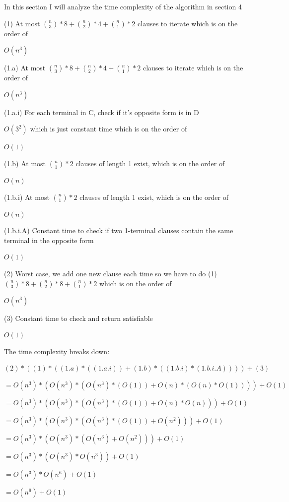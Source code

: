 \documentclass[manuscript]{acmart}
\begin{document}
    In this section I will analyze the time complexity of the algorithm in section 4

    (1) At most ${\binom{n}{3}}*8 + {\binom{n}{2}}*4 + {\binom{n}{1}}*2$ clauses to iterate which is on the order of

    $O(n^3)$

    (1.a) At most ${\binom{n}{3}}*8 + {\binom{n}{2}}*4 + {\binom{n}{1}}*2$ clauses to iterate which is on the order of

    $O(n^3)$

    (1.a.i) For each terminal in C, check if it's opposite form is in D

    $O(3^2)$ which is just constant time which is on the order of 

    $O(1)$

    (1.b) At most ${\binom{n}{1}} * 2$ clauses of length 1 exist, which is on the order of

    $O(n)$

    (1.b.i) At most ${\binom{n}{1}} * 2$ clauses of length 1 exist, which is on the order of

    $O(n)$

    (1.b.i.A) Constant time to check if two 1-terminal clauses contain the same terminal in the opposite form

    $O(1)$

    (2) Worst case, we add one new clause each time so we have to do (1) ${\binom{n}{3}} * 8 + {\binom{n}{2}} * 8 + {\binom{n}{1}} * 2$ which is on the order of

    $O(n^3)$

    (3) Constant time to check and return satisfiable

    $O(1)$

    The time complexity breaks down:

    $(2) * ((1) * ((1.a) * ((1.a.i)) + (1.b) * ((1.b.i) * (1.b.i.A)))) + (3)$

    $= O(n^3) * (O(n^3) * (O(n^3) * (O(1)) + O(n) * (O(n) * O(1)))) + O(1)$

    $= O(n^3) * (O(n^3) * (O(n^3) * (O(1)) + O(n) * O(n))) + O(1)$

    $= O(n^3) * (O(n^3) * (O(n^3) * (O(1)) + O(n^2))) + O(1)$

    $= O(n^3) * (O(n^3) * (O(n^3) + O(n^2))) + O(1)$

    $= O(n^3) * (O(n^3) * O(n^3)) + O(1)$

    $= O(n^3) * O(n^6) + O(1)$

    $= O(n^9) + O(1)$
\end{document}
